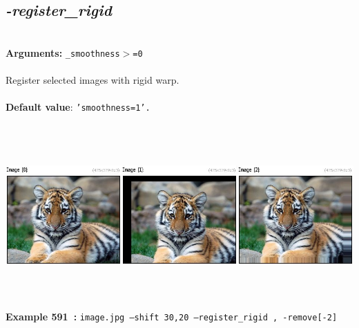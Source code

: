 \documentclass[a4paper,11pt,twoside]{book}
\begin{document}
\subsection{\emph{-register\_rigid} }\vspace*{-0.5em}
~\\\textbf{Arguments: } 
{\small \texttt{\_smoothness$>$=0}}\\~\\
Register selected images with rigid warp.
~\\~\\\textbf{Default value}: {\small \texttt{'smoothness=1'.}}
\begin{center}\includegraphics[keepaspectratio=true,height=7cm,width=\textwidth]{img/gmic_def591.jpg}\\
{\footnotesize \textbf{Example 591~:} \texttt{image.jpg --shift 30,20 --register\_rigid , -remove[-2]}}
\end{center}
\end{document}
